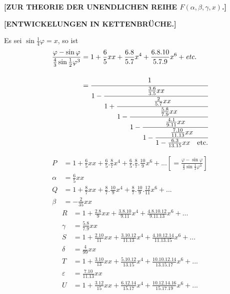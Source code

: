 \begingroup
\clearpage\NoSourceHead{}
\begin{center}\large\bfseries [ZUR THEORIE DER UNENDLICHEN REIHE $F(\alpha,\beta,\gamma,x)$.]\end{center}
\begin{center}\large\bfseries [ENTWICKELUNGEN IN KETTENBRÜCHE.]\end{center}
\noindent{\small[S. 52]}\par
\par\indent Es sei $\sin\tfrac14\varphi=x$, so ist
\[\begin{aligned}
\frac{\varphi-\sin\varphi}{\frac43\sin\frac12\varphi^3}
&=1+\frac65xx+\frac{6{.}8}{5{.}7}x^4+\frac{6{.}8{.}10}{5{.}7{.}9}x^6+\textit{etc.}\\[1em]
&=\cfrac{1}{1-\cfrac{\frac{3{.}6}{3{.}5}xx}{1+\cfrac{\frac2{5{.}7}xx}{1-\cfrac{\frac{5{.}8}{7{.}9}xx}{1-\cfrac{\frac{4{.}1}{9{.}11}xx}{1-\cfrac{\frac{7{.}10}{11{.}13}xx}{1-\frac{6{.}3}{13{.}15}xx\quad\text{etc.}}}}}}}
\end{aligned}\]
\noindent{\small[S. 54]}\par
\[\begin{aligned}
P&=1+\frac65xx+\frac65{.}\frac87x^4+\frac65{.}\frac87{.}\frac{10}9x^6+{.}{.}{.}\left[=\frac{\varphi-\sin\varphi}{\frac43\sin\frac12\varphi^3}\right]\\[1em]
\alpha&=\frac65xx\\[1em]
Q&=1+\frac87xx+\frac87{.}\frac{10}9x^4+\frac87{.}\frac{10}9{.}\frac{12}{11}x^6+{.}{.}{.}\\[1em]
\beta&=-\frac2{35}xx
\end{aligned}\]
\clearpage{}
\[\begin{aligned}
R&=1+\frac{2{.}8}9xx+\frac{3{.}8{.}10}{9{.}11}x^4+\frac{4{.}8{.}10{.}12}{9{.}11{.}13}x^6+{.}{.}{.}\\[1em]
\gamma&=\frac{5{.}8}{7{.}9}xx\\[1em]
S&=1+\frac{2{.}10}{11}xx+\frac{3{.}10{.}12}{11{.}13}x^4+\frac{4{.}10{.}12{.}14}{11{.}13{.}15}x^6+{.}{.}{.}\\[1em]
\delta&=\frac4{99}xx\\[1em]
T&=1+\frac{3{.}10}{13}xx+\frac{5{.}10{.}12}{13{.}15}x^4+\frac{10{.}10{.}12{.}14}{13{.}15{.}17}x^6+{.}{.}{.}\\[1em]
\varepsilon&=\frac{7{.}10}{11{.}13}xx\\[1em]
U&=1+\frac{3{.}12}{15}xx+\frac{6{.}12{.}14}{15{.}17}x^4+\frac{10{.}12{.}14{.}16}{15{.}17{.}19}x^6+{.}{.}{.}
\end{aligned}\]
